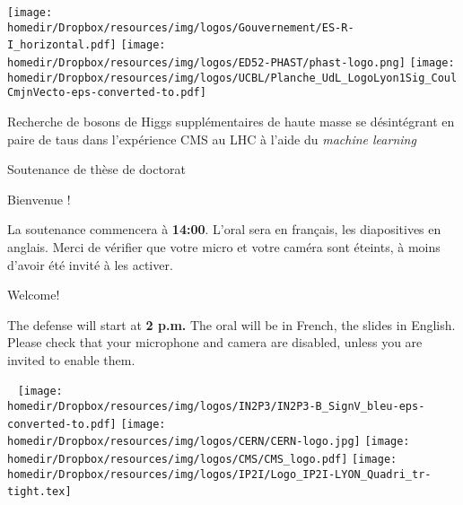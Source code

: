 \documentclass[10pt,aspectratio=169]{beamer}
\begin{document}
\begin{frame}[noframenumbering] \thispagestyle{empty}
\vspace{-.83cm}

\texttt{[image: \\homedir/Dropbox/resources/img/logos/Gouvernement/ES-R-I\_horizontal.pdf]}
\hfill
\texttt{[image: \\homedir/Dropbox/resources/img/logos/ED52-PHAST/phast-logo.png]}
\hfill
\texttt{[image: \\homedir/Dropbox/resources/img/logos/UCBL/Planche\_UdL\_LogoLyon1Sig\_CoulCmjnVecto-eps-converted-to.pdf]}

\vfill

\begin{center}
\color{CERNblue}

{\large Recherche de bosons de Higgs supplémentaires de haute masse se désintégrant en paire de taus dans l'expérience CMS au LHC à l'aide du \emph{machine learning}}

Soutenance de thèse de doctorat
\end{center}

\vfill

\begin{minipage}[c]{.49\textwidth}
{\large\color{CERNblue}Bienvenue !}

\manip La soutenance commencera à \textbf{14:00}.
\manip L'oral sera en français, les diapositives en anglais.
\manip Merci de vérifier que votre micro et votre caméra sont éteints, à moins d'avoir été invité à les activer.
\end{minipage}
\hfill
\begin{minipage}[c]{.49\textwidth}
{\large\color{CERNblue}Welcome!}

\manip The defense will start at \textbf{2 p.m.}
\manip The oral will be in French, the slides in English.
\manip Please check that your microphone and camera are disabled, unless you are invited to enable them.
\end{minipage}

\vfill

~ \hfill
\texttt{[image: \\homedir/Dropbox/resources/img/logos/IN2P3/IN2P3-B\_SignV\_bleu-eps-converted-to.pdf]}
\hfill
\texttt{[image: \\homedir/Dropbox/resources/img/logos/CERN/CERN-logo.jpg]}
\hfill
\texttt{[image: \\homedir/Dropbox/resources/img/logos/CMS/CMS\_logo.pdf]}
\hfill
\texttt{[image: \\homedir/Dropbox/resources/img/logos/IP2I/Logo\_IP2I-LYON\_Quadri\_tr-tight.tex]}
\hfill ~

\vspace{-.5cm}
\end{frame}
\end{document}

